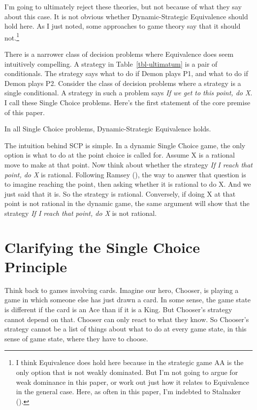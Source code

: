 \documentclass[
  10pt,
  letterpaper,
  DIV=11,
  numbers=noendperiod,
  twoside]{scrartcl}
\providecommand{\tightlist}{%
  \setlength{\itemsep}{0pt}\setlength{\parskip}{0pt}}\usepackage{longtable,booktabs,array}
\begin{document}
I'm going to ultimately reject these theories, but not because of what
they say about this case. It is not obvious whether Dynamic-Strategic
Equivalence should hold here. As I just noted, some approaches to game
theory say that it should not.\footnote{I think Equivalence does hold
  here because in the strategic game AA is the only option that is not
  weakly dominated. But I'm not going to argue for weak dominance in
  this paper, or work out just how it relates to Equivalence in the
  general case. Here, as often in this paper, I'm indebted to Stalnaker
  ().}

There is a narrower class of decision problems where Equivalence does
seem intuitively compelling. A strategy in Table~\ref{tbl-ultimatum} is
a pair of conditionals. The strategy says what to do if Demon plays P1,
and what to do if Demon plays P2. Consider the class of decision
problems where a strategy is a single conditional. A strategy in such a
problem says \emph{If we get to this point, do X}. I call these Single
Choice problems. Here's the first statement of the core premise of this
paper.

\begin{description}
\tightlist
\item[Single Choice Principle (SCP)]
In all Single Choice problems, Dynamic-Strategic Equivalence holds.
\end{description}

The intuition behind SCP is simple. In a dynamic Single Choice game, the
only option is what to do at the point choice is called for. Assume X is
a rational move to make at that point. Now think about whether the
strategy \emph{If I reach that point, do X} is rational. Following
Ramsey (), the way to
answer that question is to imagine reaching the point, then asking
whether it is rational to do X. And we just said that it is. So the
strategy is rational. Conversely, if doing X at that point is not
rational in the dynamic game, the same argument will show that the
strategy \emph{If I reach that point, do X} is not rational.

\section{Clarifying the Single Choice Principle}\label{sec-scp-clarify}

Think back to games involving cards. Imagine our hero, Chooser, is
playing a game in which someone else has just drawn a card. In some
sense, the game state is different if the card is an Ace than if it is a
King. But Chooser's strategy cannot depend on that. Chooser can only
react to what they know. So Chooser's strategy cannot be a list of
things about what to do at every game state, in this sense of game
state, where they have to choose.
\end{document}
